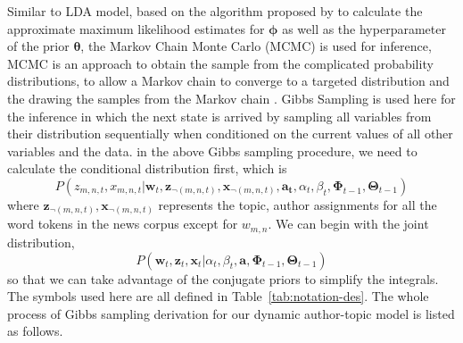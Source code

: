 Similar to LDA model, based on the algorithm proposed by \cite{blei2003latent} to calculate the approximate maximum likelihood estimates for $\boldsymbol{\phi}$ as well as the hyperparameter of the prior $\boldsymbol{\theta}$, the Markov Chain Monte Carlo (MCMC) is used for inference, MCMC is an approach to obtain the sample from the complicated probability distributions, to allow a Markov chain to converge to a targeted distribution and the drawing the samples from the Markov chain \cite{gilks1996introducing}. Gibbs Sampling is used here for the inference in which the next state is arrived by sampling all variables from their distribution sequentially when conditioned on the current values of all other variables and the data.
in the above Gibbs sampling procedure, we need to calculate the conditional distribution first, which is
\begin{equation}
P({z}_{m, n, t},{x}_{m, n, t}| \mathbf{w}_t,\mathbf{z}_{\neg(m, n, t)}, \mathbf{x}_{\neg(m, n, t)},\mathbf{a_t},\alpha_t, \beta_t,\boldsymbol{\Phi}_{t-1}, \boldsymbol{\Theta}_{t-1})
\label{eq:conditional}
\end{equation}
where $\mathbf{z}_{\neg(m, n, t)}, \mathbf{x}_{\neg(m, n, t)}$ represents the topic, author assignments for all the word tokens in the news corpus except for $w_{m,n}$. We can begin with the joint distribution,
\begin{equation}
P(\mathbf{w}_t, \mathbf{z}_t ,\mathbf{x}_t| \alpha_t, \beta_t,\mathbf{a}, \boldsymbol{\Phi}_{t-1}, \boldsymbol{\Theta}_{t-1})
\end{equation}
so that we can take advantage of the conjugate priors to simplify the integrals. The symbols used here are all defined in Table~\ref{tab:notation-des}. The whole process of Gibbs sampling derivation for our dynamic author-topic model is listed as follows.
